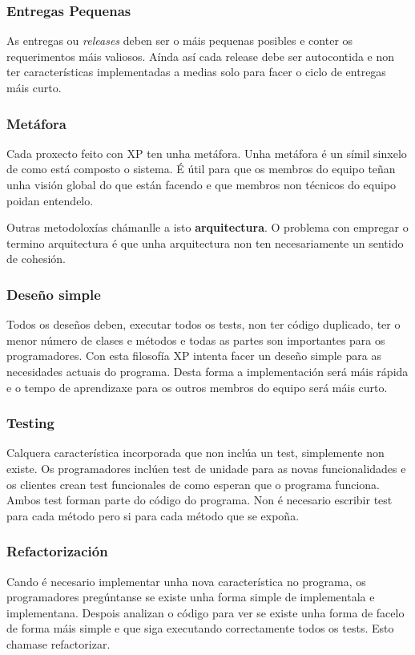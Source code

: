 \subsubsection{Entregas Pequenas}
As entregas ou \emph{releases} deben ser o máis pequenas posibles e conter os requerimentos máis valiosos. Aínda así cada release debe ser autocontida e non ter características implementadas a medias solo para facer o ciclo de entregas máis curto.

\subsubsection{Metáfora}
Cada proxecto feito con XP ten unha metáfora. Unha metáfora é un símil sinxelo de como está composto o sistema. É útil para que os membros do equipo teñan unha visión global do que están facendo e que membros non técnicos do equipo poidan entendelo.

Outras metodoloxías chámanlle a isto \textbf{arquitectura}. O problema con empregar o termino arquitectura é que unha arquitectura non ten necesariamente un sentido de cohesión.

\subsubsection{Deseño simple}
Todos os deseños deben, executar todos os tests, non ter código duplicado, ter o menor número de clases e métodos e todas as partes son importantes para os programadores. Con esta filosofía XP intenta facer un deseño simple para as necesidades actuais do programa. Desta forma a implementación será máis rápida e o tempo de aprendizaxe para os outros membros do equipo será máis curto.

\subsubsection{Testing}
Calquera característica incorporada que non inclúa un test, simplemente non existe. Os programadores inclúen test de unidade para as novas funcionalidades e os clientes crean test funcionales de como esperan que o programa funciona. Ambos test forman parte do código do programa. Non é necesario escribir test para cada método pero si para cada método que se expoña.

\subsubsection{Refactorización}
Cando é necesario implementar unha nova característica no programa, os programadores pregúntanse se existe unha forma simple de implementala e implementana. Despois analizan o código para ver se existe unha forma de facelo de forma máis simple e que siga executando correctamente todos os tests. Esto chamase refactorizar.

